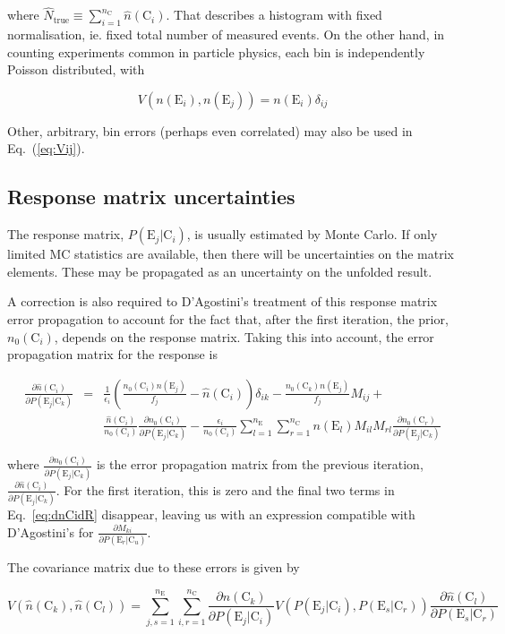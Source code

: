 \documentclass[12pt,a4paper]{article}
\newcommand{\E}{\mathrm{E}}
\newcommand{\C}{\mathrm{C}}
\newcommand{\dd}[2]{\frac{\partial{#1}}{\partial{#2}}}
\begin{document}
where $\hat{N}_{\mathrm{true}} \equiv \sum_{i=1}^{n_{\C}} \hat{n}(\C_i)$.
That describes a histogram with fixed normalisation, ie. fixed total number of measured events.
On the other hand, in counting experiments common in particle physics, each bin is independently Poisson distributed, with

\begin{equation}
V(n(\E_i),n(\E_j)) = n(\E_i) \delta_{ij}
\end{equation}

Other, arbitrary, bin errors (perhaps even correlated) may also be used in Eq.~(\ref{eq:Vij}).

\subsection{Response matrix uncertainties}

The response matrix, $P(\E_j|\C_i)$, is usually estimated by Monte Carlo. If only limited MC statistics
are available, then there will be uncertainties on the matrix elements.
These may be propagated as an uncertainty on the unfolded result.

A correction is also required to D'Agostini's treatment of this response matrix error propagation
to account for the fact that, after the first iteration, the prior, $n_0(\C_i)$, depends on the response matrix.
Taking this into account, the error propagation matrix for the response is

\begin{eqnarray}
\dd{\hat{n}(\C_i)}{P(\E_j|\C_k)} & = & \frac{1}{\epsilon_i} \left( \frac{n_0(\C_i) n(\E_j)}{f_j} - \hat{n}(\C_i) \right) \delta_{ik}  - \frac{n_0(\C_k) n(\E_j)}{f_j} M_{ij} + \nonumber \\
& & \frac{\hat{n}(\C_i)}{n_0(\C_i)} \dd{n_0(\C_i)}{P(\E_j|\C_k)} - \frac{\epsilon_i}{n_0(\C_i)} \sum_{l=1}^{n_{\E}} \sum_{r=1}^{n_{\C}} n(\E_l) M_{il} M_{rl} \dd{n_0(\C_r)}{P(\E_j|\C_k)}
\label{eq:dnCidR}
\end{eqnarray}

where $\dd{n_0(\C_i)}{P(\E_j|\C_k)}$ is the error propagation matrix from the previous iteration,
$\dd{\hat{n}(\C_i)}{P(\E_j|\C_k)}$. For the first iteration, this is zero and the final two terms in
Eq.~\ref{eq:dnCidR} disappear, leaving us with an expression compatible with D'Agostini's for $\dd{M_{ki}}{P(\E_r|\C_u)}$.

The covariance matrix due to these errors is given by

\begin{equation}
V(\hat{n}(\C_k),\hat{n}(\C_l)) = \sum_{j,s=1}^{n_{\E}} \sum_{i,r=1}^{n_{\C}} \dd{\hat{n}(\C_k)}{P(\E_j|\C_i)} V(P(\E_j|\C_i),P(\E_s|\C_r)) \dd{\hat{n}(\C_l)}{P(\E_s|\C_r)}
\end{equation}
\end{document}
